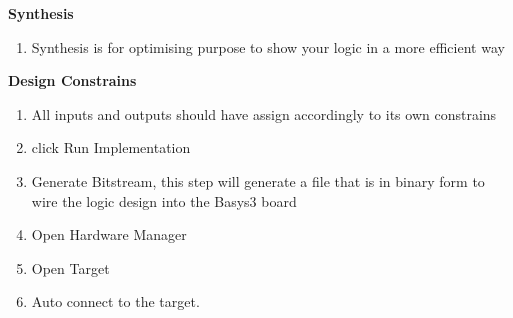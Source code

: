 \textbf{Synthesis}
\begin{enumerate}
    \item Synthesis is for optimising purpose to show your logic in a more efficient way
\end{enumerate}
\textbf{Design Constrains}
\begin{enumerate}
    \item All inputs and outputs should have assign accordingly to its own constrains
    \item click Run Implementation
    \item Generate Bitstream, this step will generate a file that is in binary form to wire the logic design into the Basys3 board
    \item Open Hardware Manager
    \item Open Target
    \item Auto connect to the target.
\end{enumerate}
